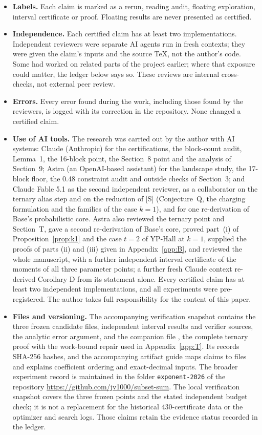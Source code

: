 \documentclass[11pt]{article}
\theoremstyle{plain}
\begin{document}
\begin{itemize}
\item \textbf{Labels.} Each claim is marked as a rerun, reading audit, floating exploration, interval certificate or proof. Floating results are never presented as certified.
\item \textbf{Independence.} Each certified claim has at least two implementations. Independent reviewers were separate AI agents run in fresh contexts; they were given the claim's inputs and the source \TeX, not the author's code. Some had worked on related parts of the project earlier; where that exposure could matter, the ledger below says so. These reviews are internal cross-checks, not external peer review.
\item \textbf{Errors.} Every error found during the work, including those found by the reviewers, is logged with its correction in the repository. None changed a certified claim.
\item \textbf{Use of AI tools.} The research was carried out by the author with AI systems: Claude (Anthropic) for the certifications, the block-count audit, Lemma~1, the 16-block point, the Section~8 point and the analysis of Section~9; Astra (an OpenAI-based assistant) for the landscape study, the 17-block floor, the 0.48 constraint audit and outside checks of Section~3; and Claude Fable 5.1 as the second independent reviewer, as a collaborator on the ternary alias step and on the reduction of [S] (Conjecture~Q, the charging formulation and the families of the case $k = 1$), and for one re-derivation of Base's probabilistic core. Astra also reviewed the ternary point and Section~T, gave a second re-derivation of Base's core, proved part~(i) of Proposition~\ref{prop:k1} and the case $t = 2$ of YP-Hall at $k = 1$, supplied the proofs of parts (ii) and (iii) given in Appendix~\ref{app:B}, and reviewed the whole manuscript, with a further independent interval certificate of the moments of all three parameter points; a further fresh Claude context re-derived Corollary D from its statement alone. Every certified claim has at least two independent implementations, and all experiments were pre-registered. The author takes full responsibility for the content of this paper.
\item \textbf{Files and versioning.} The accompanying verification snapshot contains the three frozen candidate files, independent interval results and verifier sources, the analytic error argument, and the companion file , the complete ternary proof with the work-bound repair used in Appendix~\ref{app:T}. Its  records SHA-256 hashes, and the accompanying artifact guide maps claims to files and explains coefficient ordering and exact-decimal inputs. The broader experiment record is maintained in the folder \texttt{exponent-2026} of the repository \url{https://github.com/jv1000/subset-sum}. The local verification snapshot covers the three frozen points and the stated independent budget check; it is not a replacement for the historical 430-certificate data or the optimizer and search logs. Those claims retain the evidence status recorded in the ledger.
\end{itemize}
\end{document}
